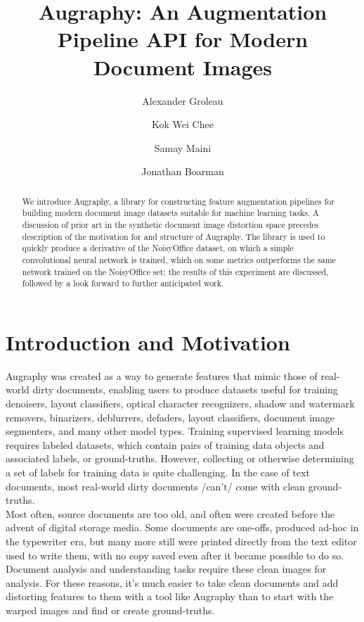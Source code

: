 \documentclass[runningheads]{llncs}
\begin{document}
\title{Augraphy: An Augmentation Pipeline API for Modern Document Images}
\author{Alexander Groleau \and
Kok Wei Chee \and
Samay Maini \and
Jonathan Boarman}



\maketitle

\begin{abstract}
We introduce Augraphy, a library for constructing feature augmentation pipelines for building modern document image datasets suitable for machine learning tasks. A discussion of prior art in the synthetic document image distortion space precedes description of the motivation for and structure of Augraphy. The library is used to quickly produce a derivative of the NoisyOffice dataset, on which a simple convolutional neural network is trained, which on some metrics outperforms the same network trained on the NoisyOffice set; the results of this experiment are discussed, followed by a look forward to further anticipated work.
\end{abstract}

\section{Introduction and Motivation}
Augraphy was created as a way to generate features that mimic those of real-world dirty documents, enabling users to produce datasets useful for training denoisers, layout classifiers, optical character recognizers, shadow and watermark removers, binarizers, deblurrers, defaders, layout classifiers, document image segmenters, and many other model types. Training supervised learning models requires labeled datasets, which contain pairs of training data objects and associated labels, or ground-truths. However, collecting or otherwise determining a set of labels for training data is quite challenging.  In the case of text documents, most real-world dirty documents /can't/ come with clean ground-truths.\\

Most often, source documents are too old, and often were created before the advent of digital storage media. Some documents are one-offs, produced ad-hoc in the typewriter era, but many more still were printed directly from the text editor used to write them, with no copy saved even after it became possible to do so. Document analysis and understanding tasks require these clean images for analysis. For these reasons, it's much easier to take clean documents and add distorting features to them with a tool like Augraphy than to start with the warped images and find or create ground-truths.
\end{document}
